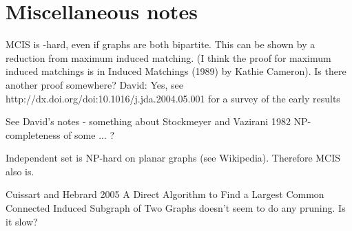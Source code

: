 \section{Miscellaneous notes}

MCIS is \NP-hard, even if graphs are both bipartite.  This can be shown by a
reduction from maximum induced matching.  (I think the proof for maximum induced
matchings is in Induced Matchings (1989) by Kathie Cameron). Is there another
proof somewhere? David: Yes, see http://dx.doi.org/doi:10.1016/j.jda.2004.05.001 for a survey of the early results

See David's notes - something about Stockmeyer and Vazirani 1982 NP-completeness of some ... ?

Independent set is NP-hard on planar graphs (see Wikipedia).  Therefore
MCIS also is.

Cuissart and Hebrard 2005 A Direct Algorithm to Find a Largest Common
Connected Induced Subgraph of Two Graphs doesn't seem to do any
pruning.  Is it slow?

